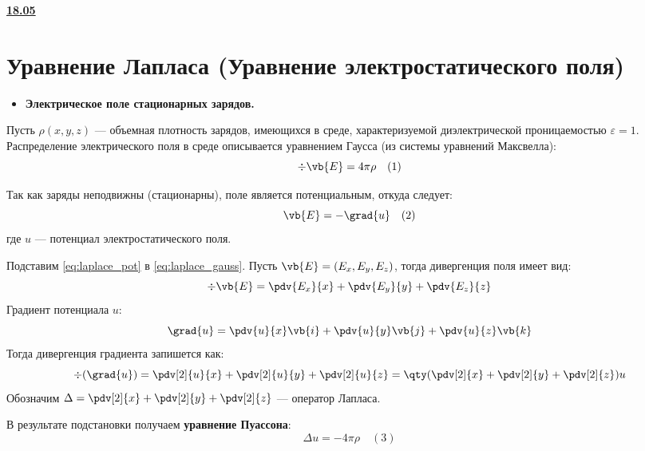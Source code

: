 \noindent\underline{\textbf{18.05}}

\section{Уравнение Лапласа (Уравнение электростатического поля)}

\begin{itemize}
	\item \textbf{Электрическое поле стационарных зарядов.}
\end{itemize}

Пусть $\rho(x,y,z)$ --- объемная плотность зарядов, имеющихся в среде, характеризуемой диэлектрической проницаемостью $\varepsilon = 1$. Распределение электрического поля в среде описывается уравнением Гаусса (из системы уравнений Максвелла):
\begin{equation} \label{eq:laplace_gauss}
	\div{\vb{E}} = 4\pi\rho \quad (1)
\end{equation}

Так как заряды неподвижны (стационарны), поле является потенциальным, откуда следует:
\begin{equation} \label{eq:laplace_pot}
	\vb{E} = -\grad{u} \quad (2)
\end{equation}
где $u$ --- потенциал электростатического поля.

\begin{proofbox}
	Подставим \eqref{eq:laplace_pot} в \eqref{eq:laplace_gauss}.
	Пусть $\vb{E} = (E_x, E_y, E_z)$, тогда дивергенция поля имеет вид:
	\begin{equation*}
		\div{\vb{E}} = \pdv{E_x}{x} + \pdv{E_y}{y} + \pdv{E_z}{z}
	\end{equation*}
	Градиент потенциала $u$:
	\begin{equation*}
		\grad{u} = \pdv{u}{x}\vb{i} + \pdv{u}{y}\vb{j} + \pdv{u}{z}\vb{k}
	\end{equation*}
	Тогда дивергенция градиента запишется как:
	\begin{equation*}
		\div(\grad{u}) = \pdv[2]{u}{x} + \pdv[2]{u}{y} + \pdv[2]{u}{z} = \qty(\pdv[2]{x} + \pdv[2]{y} + \pdv[2]{z})u
	\end{equation*}
	Обозначим $\Delta = \pdv[2]{x} + \pdv[2]{y} + \pdv[2]{z}$ --- оператор Лапласа.
\end{proofbox}

В результате подстановки получаем \textbf{уравнение Пуассона}:
\begin{equation} \label{eq:poisson}
	\Delta u = -4\pi\rho \quad (3)
\end{equation}

